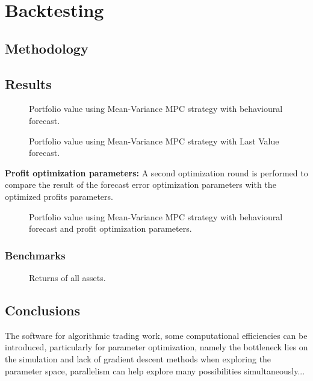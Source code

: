 \clearpage

\section{Backtesting} \label{sec:ch5_backtest}

\subsection{Methodology}

\subsection{Results}
\begin{figure}[ht!]
    \centering
    
    \caption{Portfolio value using Mean-Variance MPC strategy with behavioural forecast.}
    \label{fig:MPC_Behavioural}
\end{figure}

\begin{figure}[ht!]
    \centering
    
    \caption{Portfolio value using Mean-Variance MPC strategy with Last Value forecast.}
    \label{fig:MPC_LV}
\end{figure}

\textbf{Profit optimization parameters:} A second optimization round is performed to compare the result of the forecast error optimization parameters with the optimized profits parameters.

\begin{figure}[ht!]
    \centering
    
    \caption{Portfolio value using Mean-Variance MPC strategy with behavioural forecast and profit optimization parameters.}
    \label{fig:MPC_BehaviouralTuned}
\end{figure}

\subsubsection{Benchmarks}


\begin{figure}[ht!]
    \centering
    
    \caption{Returns of all assets.}
    \label{fig:E1_02_best_static_asset_return_all}
\end{figure}

\subsection{Conclusions}

The software for algorithmic trading work, some computational efficiencies can be introduced, particularly for parameter optimization, namely the bottleneck lies on the simulation and lack of gradient descent methods when exploring the parameter space, parallelism can help explore many possibilities simultaneously...
